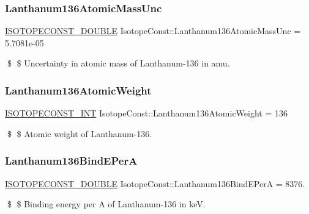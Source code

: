 \subsubsection{\texorpdfstring{Lanthanum136\+Atomic\+Mass\+Unc}{Lanthanum136AtomicMassUnc}}
{\footnotesize\ttfamily \mbox{\hyperlink{group___isotope_const-_macros_ga8f45a7272ce02c0b4c65c44636ed719a}{I\+S\+O\+T\+O\+P\+E\+C\+O\+N\+S\+T\+\_\+\+D\+O\+U\+B\+LE}} Isotope\+Const\+::\+Lanthanum136\+Atomic\+Mass\+Unc = 5.\+7081e-\/05}

\$ \$ Uncertainty in atomic mass of Lanthanum-\/136 in amu. \mbox{\label{group___isotope_const-_lanthanum-_la136_ga26790d01b991d561cc493367d1a28e7f}} 
\subsubsection{\texorpdfstring{Lanthanum136\+Atomic\+Weight}{Lanthanum136AtomicWeight}}
{\footnotesize\ttfamily \mbox{\hyperlink{group___isotope_const-_macros_ga5f18360b3e99483a35c32d789e62621c}{I\+S\+O\+T\+O\+P\+E\+C\+O\+N\+S\+T\+\_\+\+I\+NT}} Isotope\+Const\+::\+Lanthanum136\+Atomic\+Weight = 136}

\$ \$ Atomic weight of Lanthanum-\/136. \mbox{\label{group___isotope_const-_lanthanum-_la136_gae46181a1ad709f8b033962a7c0e40152}} 
\subsubsection{\texorpdfstring{Lanthanum136\+Bind\+E\+PerA}{Lanthanum136BindEPerA}}
{\footnotesize\ttfamily \mbox{\hyperlink{group___isotope_const-_macros_ga8f45a7272ce02c0b4c65c44636ed719a}{I\+S\+O\+T\+O\+P\+E\+C\+O\+N\+S\+T\+\_\+\+D\+O\+U\+B\+LE}} Isotope\+Const\+::\+Lanthanum136\+Bind\+E\+PerA = 8376.}

\$ \$ Binding energy per A of Lanthanum-\/136 in keV. \mbox{\label{group___isotope_const-_lanthanum-_la136_gafd6b3f8e76f0dd8298f70008486852ad}} 
